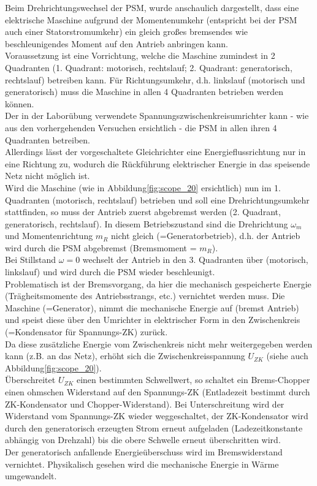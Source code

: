 Beim Drehrichtungswechsel der PSM, wurde anschaulich dargestellt, dass eine elektrische Maschine aufgrund der Momentenumkehr (entspricht bei der PSM auch einer Statorstromumkehr) ein gleich großes bremsendes wie beschleunigendes Moment auf den Antrieb anbringen kann.\\
Voraussetzung ist eine Vorrichtung, welche die Maschine zumindest in 2 Quadranten (1. Quadrant: motorisch, rechtslauf; 2. Quadrant: generatorisch, rechtslauf) betreiben kann. Für Richtungsumkehr, d.h. linkslauf (motorisch und generatorisch) muss die Maschine in allen 4 Quadranten betrieben werden können.\\
Der in der Laborübung verwendete Spannungszwischenkreisumrichter kann - wie aus den vorhergehenden Versuchen ersichtlich - die PSM in allen ihren 4 Quadranten betreiben.\\
Allerdings lässt der vorgeschaltete Gleichrichter eine Energieflussrichtung nur in eine Richtung zu, wodurch die Rückführung elektrischer Energie in das speisende Netz nicht möglich ist.\\
Wird die Maschine (wie in Abbildung\;\ref{fig:scope_20} ersichtlich) nun im 1. Quadranten (motorisch, rechtslauf) betrieben und soll eine Drehrichtungsumkehr stattfinden, so muss der Antrieb zuerst abgebremst werden (2. Quadrant, generatorisch, rechtslauf). In diesem Betriebszustand sind die Drehrichtung $\omega_m$ und Momentenrichtung $m_R$ nicht gleich (=Generatorbetrieb), d.h. der Antrieb wird durch die PSM abgebremst (Bremsmoment = $m_R$).\\
Bei Stillstand $\omega=0$ wechselt der Antrieb in den 3. Quadranten über (motorisch, linkslauf) und wird durch die PSM wieder beschleunigt.\\
Problematisch ist der Bremsvorgang, da hier die mechanisch gespeicherte Energie (Trägheitsmomente des Antriebsstrangs, etc.) vernichtet werden muss. Die Maschine (=Generator), nimmt die mechanische Energie auf (bremst Antrieb) und speist diese über den Umrichter in elektrischer Form in den Zwischenkreis (=Kondensator für Spannungs-ZK) zurück.\\
Da diese zusätzliche Energie vom Zwischenkreis nicht mehr weitergegeben werden kann (z.B. an das Netz), erhöht sich die Zwischenkreisspannung $U_{ZK}$ (siehe auch Abbildung\;\ref{fig:scope_20}).\\
Überschreitet $U_{ZK}$ einen bestimmten Schwellwert, so schaltet ein Brems-Chopper einen ohmschen Widerstand auf den Spannungs-ZK (Entladezeit bestimmt durch ZK-Kondensator und Chopper-Widerstand). Bei Unterschreitung wird der Widerstand vom Spannungs-ZK wieder weggeschaltet, der ZK-Kondensator wird durch den generatorisch erzeugten Strom erneut aufgeladen (Ladezeitkonstante abhängig von Drehzahl) bis die obere Schwelle erneut überschritten wird.\\
Der generatorisch anfallende Energieüberschuss wird im Bremswiderstand vernichtet. Physikalisch gesehen wird die mechanische Energie in Wärme umgewandelt.

 
 
 
 
 
 
 
